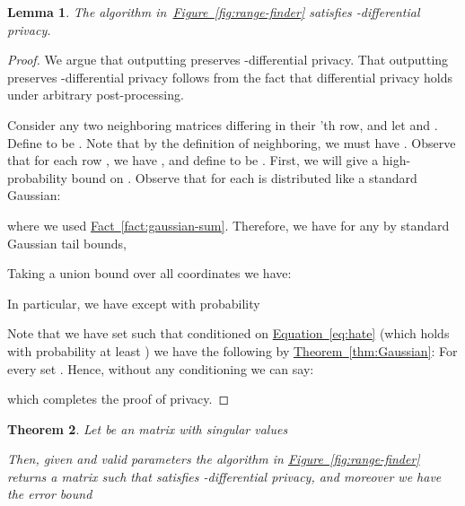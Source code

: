 \documentclass[letterpaper,11pt]{article}
\newtheorem{theorem}{Theorem}[section]
\newtheorem{lemma}[theorem]{Lemma}
\theoremstyle{definition}
\newcommand{\equationref}[1]{\hyperref[eq:#1]{Equation~\ref{eq:#1}}}
\newcommand{\factref}[1]{\hyperref[fact:#1]{Fact~\ref{fact:#1}}}
\newcommand{\figureref}[1]{\hyperref[fig:#1]{Figure~\ref{fig:#1}}}
\newcommand{\theoremref}[1]{\hyperref[thm:#1]{Theorem~\ref{thm:#1}}}
\begin{document}
\begin{lemma}
\label{lem:range-privacy}
The algorithm in~\figureref{range-finder} satisfies -differential
privacy.
\end{lemma}

\begin{proof}
We argue that outputting   preserves -differential privacy. That outputting  preserves -differential privacy follows from the fact that differential privacy holds under arbitrary post-processing.

Consider any two neighboring matrices 
differing in their 'th row, and let  and .
Define  to be . Note that by the
definition of neighboring, we must have . Observe that for
each row , we have , and define  to be . First, we will
give a high-probability bound on . Observe that for each   is distributed like a standard Gaussian:

where we used \factref{gaussian-sum}.
Therefore, we have for any 
by standard Gaussian tail bounds,

Taking a union bound
over all  coordinates we have:

In particular, we have except with probability 

Note that we have set  such that
conditioned on \equationref{hate} (which holds with probability at
least ) we have the following by \theoremref{Gaussian}:
For every set 
.
Hence, without any conditioning we can say:

which completes the proof of privacy.
\end{proof}

\begin{theorem}
Let  be an  matrix with singular values

Then, given  and valid parameters 
the algorithm in \figureref{range-finder} returns a matrix  such that
 satisfies -differential privacy,
and moreover we have the error bound

\end{theorem}
\end{document}
